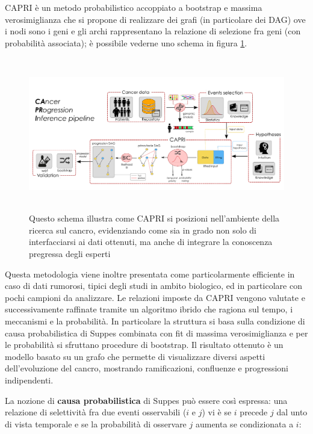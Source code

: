 \documentclass[a4paper]{article}
\begin{document}
	CAPRI è un metodo probabilistico accoppiato a bootstrap e massima verosimiglianza che si propone di realizzare dei 
	grafi (in particolare dei DAG) ove i nodi sono i geni e gli archi rappresentano la relazione di selezione fra geni
	(con probabilità associata); è possibile vederne uno schema in figura \ref{fig:CAPRI}.

	\begin{figure}[h]
	  \centering
	  \includegraphics[height=6.7cm, keepaspectratio]{CAPRI.png}%
	  \captionsetup{justification=centering,margin=0.5cm}
	  \caption{Questo schema illustra come CAPRI si posizioni nell'ambiente della ricerca sul cancro, evidenziando come  
		sia in grado non solo di interfacciarsi ai dati ottenuti, ma anche di integrare la conoscenza pregressa degli esperti} \label{fig:CAPRI}
	\end{figure}

	Questa metodologia viene inoltre presentata come particolarmente efficiente in caso di dati rumorosi, tipici
	degli studi in ambito biologico, ed in particolare con pochi campioni da analizzare. 
	Le relazioni imposte da CAPRI vengono valutate e successivamente raffinate tramite un algoritmo ibrido che 
	ragiona sul tempo, i meccanismi e la probabilità. In particolare la struttura si basa sulla condizione di causa probabilistica di 
	Suppes combinata con fit di massima verosimiglianza e per le probabilità si sfruttano procedure di bootstrap.
	Il risultato ottenuto è un modello basato su un grafo che permette di visualizzare diversi aspetti dell'evoluzione
	del cancro, mostrando ramificazioni, confluenze e progressioni indipendenti.	

	La nozione di \textbf{causa probabilistica} di Suppes può essere così espressa: una relazione di selettività fra due eventi osservabili
	($i$ e $j$) vi è se $i$ precede $j$ dal unto di vista temporale e se la probabilità di osservare $j$ aumenta se condizionata a $i$:
	
\end{document}
